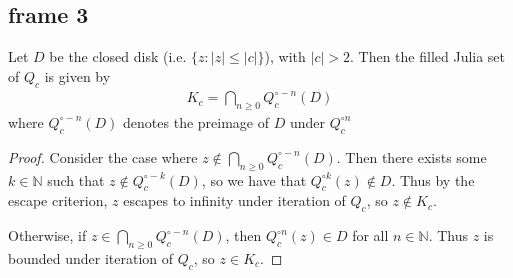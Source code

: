 \documentclass[xcolor=x11names,compress]{beamer}
\renewcommand{\(}{\begin{columns}}
\renewcommand{\)}{\end{columns}}
\newcommand{\<}[1]{\begin{column}{#1}}
\renewcommand{\>}{\end{column}}
\begin{document}
\subsection{frame 3}
\begin{frame}

\begin{theorem}
Let $D$ be the closed disk (i.e. $\{z : |z| \le |c|\}$), with $|c|>2$. Then the filled Julia set of $Q_c$ is given by
\begin{align*}
K_c = \bigcap\limits_{n\ge 0} Q_c^{\circ -n} (D)
\end{align*}
where $Q_c^{\circ -n} (D)$ denotes the preimage of $D$ under $Q_c^{\circ n}$
\end{theorem}

\begin{proof}
    Consider the case where
    $z\notin \bigcap_{n\ge 0} Q_c^{\circ -n} (D)$.
    Then there exists some $k\in \mathbb{N}$ such that $z\notin Q_c^{\circ -k} (D)$,
    so we have that $Q_c^{\circ k}(z) \notin D$. 
    Thus by the escape criterion, $z$ escapes to infinity under iteration
    of $Q_c$, so $z\notin K_c$.  

    Otherwise, if $z\in \bigcap_{n\ge 0} Q_c^{\circ -n} (D)$, then 
     $Q_c^{\circ n}(z) \in D$ for all $n\in \mathbb{N}$. Thus $z$ is bounded under
     iteration of $Q_c$, so $z\in K_c$.
\end{proof}
\end{frame}


\end{document}
